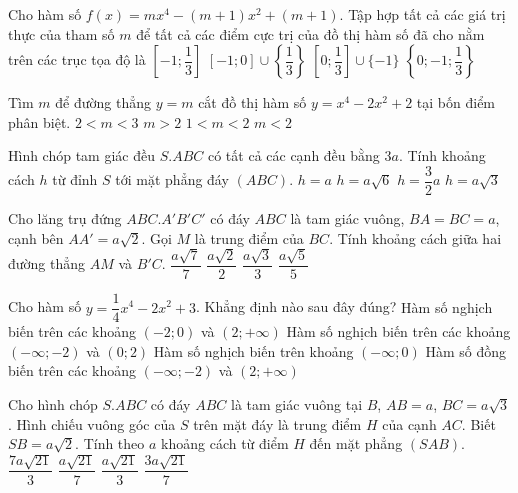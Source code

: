 \begin{ex}%
Cho hàm số $f(x)=mx^4-(m+1)x^2+(m+1)$. Tập hợp tất cả các giá trị thực của tham số $m$ để tất cả các điểm cực trị của đồ thị hàm số đã cho nằm trên các trục tọa độ là
	\choice
	{$\left[-1; \dfrac{1}{3}\right]$}
	{$[-1;0]\cup\left\{\dfrac{1}{3}\right\}$}
	{$\left[0; \dfrac{1}{3}\right]\cup\{-1\}$}
	{\True $\left\{0;-1;\dfrac{1}{3}\right\}$}
\end{ex}
\begin{ex}%
Tìm $m$ để đường thẳng $y=m$ cắt đồ thị hàm số $y=x^4-2x^2+2$ tại bốn điểm phân biệt.
	\choice
	{$2<m<3$}
	{$m>2$}
	{\True $1<m<2$}
	{$m<2$}
\end{ex}
\begin{ex}%
Hình chóp tam giác đều $S.ABC$ có tất cả các cạnh đều bằng $3a$. Tính khoảng cách $h$ từ đỉnh $S$ tới mặt phẳng đáy $(ABC)$.
	\choice
	{$h=a$}
	{\True $h=a\sqrt{6}$}
	{$h=\dfrac{3}{2}a$}
	{$h=a\sqrt{3}$}
\end{ex}
\begin{ex}%
Cho lăng trụ đứng $ABC.A'B'C'$ có đáy $ABC$ là tam giác vuông, $BA=BC=a$, cạnh bên $AA'=a\sqrt{2}$. Gọi $M$ là trung điểm của $BC$. Tính khoảng cách giữa hai đường thẳng $AM$ và $B'C$.
	\choice
	{\True $\dfrac{a\sqrt{7}}{7}$}
	{$\dfrac{a\sqrt{2}}{2}$}
	{$\dfrac{a\sqrt{3}}{3}$}
	{$\dfrac{a\sqrt{5}}{5}$}
\end{ex}
\begin{ex}%
Cho hàm số $y=\dfrac{1}{4}x^4-2x^2+3$. Khẳng định nào sau đây đúng?
	\choice
	{Hàm số nghịch biến trên các khoảng $(-2;0)$ và $(2;+\infty)$}
	{\True Hàm số nghịch biến trên các khoảng $(-\infty;-2)$ và $(0;2)$}
	{Hàm số nghịch biến trên khoảng $(-\infty;0)$}
	{Hàm số đồng biến trên các khoảng $(-\infty;-2)$ và $(2;+\infty)$}
\end{ex}
\begin{ex}%
	Cho hình chóp $S.ABC$ có đáy $ABC$ là tam giác vuông tại $B$, $AB=a$, $BC=a\sqrt{3}$. Hình chiếu vuông góc của $S$ trên mặt đáy là trung điểm $H$ của cạnh $AC$. Biết $SB=a\sqrt{2}$. Tính theo $a$ khoảng cách từ điểm $H$ đến mặt phẳng $(SAB)$.
	\choice
	{$\dfrac{7a\sqrt{21}}{3}$}
	{\True $\dfrac{a\sqrt{21}}{7}$}
	{$\dfrac{a\sqrt{21}}{3}$}
	{$\dfrac{3a\sqrt{21}}{7}$}
\end{ex}
